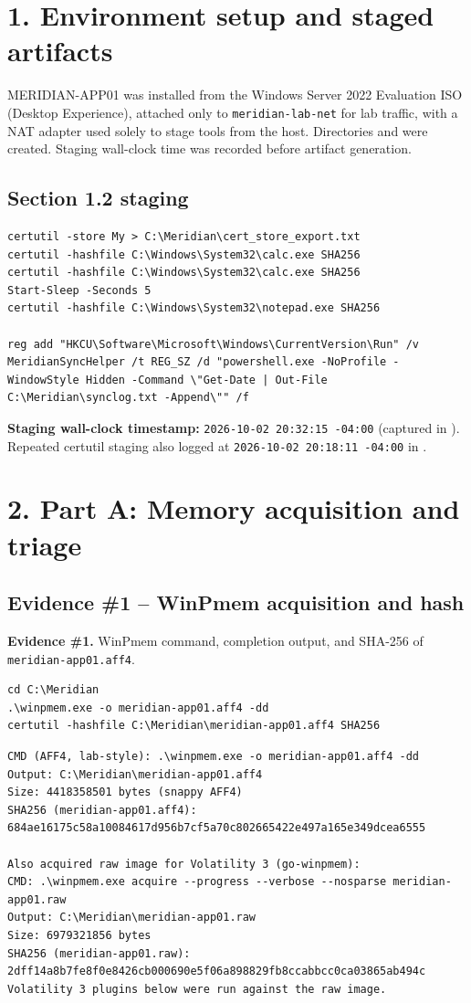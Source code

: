 \documentclass[11pt,letterpaper]{article}
\newcommand{\labpart}[1]{%
  \par\vspace{0.35em}%
  \Needspace{8\baselineskip}%
  \section*{#1}%
  \nopagebreak
}
\newcommand{\labstep}[1]{%
  \Needspace{6\baselineskip}%
  \subsection*{#1}%
  \nopagebreak
}
\newcommand{\evidencebox}[2]{%
  \par\vspace{0.25em}%
  \noindent\colorbox{okbox}{\parbox{\dimexpr\linewidth-2\fboxsep\relax}{%
    \textbf{Evidence \#{#1}.} #2}}%
  \par\vspace{0.25em}%
}
\begin{document}
\labpart{1. Environment setup and staged artifacts}

MERIDIAN-APP01 was installed from the Windows Server 2022 Evaluation ISO (Desktop Experience), attached only to \texttt{meridian-lab-net} for lab traffic, with a NAT adapter used solely to stage tools from the host. Directories  and  were created. Staging wall-clock time was recorded before artifact generation.

\labstep{Section 1.2 staging}

\begin{lstlisting}
certutil -store My > C:\Meridian\cert_store_export.txt
certutil -hashfile C:\Windows\System32\calc.exe SHA256
certutil -hashfile C:\Windows\System32\calc.exe SHA256
Start-Sleep -Seconds 5
certutil -hashfile C:\Windows\System32\notepad.exe SHA256

reg add "HKCU\Software\Microsoft\Windows\CurrentVersion\Run" /v MeridianSyncHelper /t REG_SZ /d "powershell.exe -NoProfile -WindowStyle Hidden -Command \"Get-Date | Out-File C:\Meridian\synclog.txt -Append\"" /f
\end{lstlisting}

\textbf{Staging wall-clock timestamp:} \texttt{2026-10-02 20:32:15 -04:00}
(captured in ).
Repeated certutil staging also logged at \texttt{2026-10-02 20:18:11 -04:00}
in .

\labpart{2. Part A: Memory acquisition and triage}

\labstep{Evidence \#1 -- WinPmem acquisition and hash}

\evidencebox{1}{WinPmem command, completion output, and SHA-256 of \texttt{meridian-app01.aff4}.}

\begin{lstlisting}
cd C:\Meridian
.\winpmem.exe -o meridian-app01.aff4 -dd
certutil -hashfile C:\Meridian\meridian-app01.aff4 SHA256
\end{lstlisting}

\begin{lstlisting}
CMD (AFF4, lab-style): .\winpmem.exe -o meridian-app01.aff4 -dd
Output: C:\Meridian\meridian-app01.aff4
Size: 4418358501 bytes (snappy AFF4)
SHA256 (meridian-app01.aff4):
684ae16175c58a10084617d956b7cf5a70c802665422e497a165e349dcea6555

Also acquired raw image for Volatility 3 (go-winpmem):
CMD: .\winpmem.exe acquire --progress --verbose --nosparse meridian-app01.raw
Output: C:\Meridian\meridian-app01.raw
Size: 6979321856 bytes
SHA256 (meridian-app01.raw):
2dff14a8b7fe8f0e8426cb000690e5f06a898829fb8ccabbcc0ca03865ab494c
Volatility 3 plugins below were run against the raw image.
\end{lstlisting}
\end{document}
